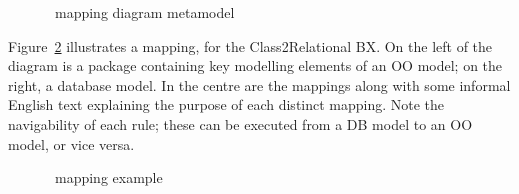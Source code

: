 \begin{figure}[htbp]
\caption{\transml\ mapping diagram metamodel}
\label{fig:transml-mapping-diagram}
\end{figure}

Figure~\ref{fig:transml-mapping-example1} illustrates a mapping, for the Class2Relational BX. On the left of the diagram is a package containing key modelling elements of an OO model; on the right, a database model. In the centre are the mappings along with some informal English text explaining the purpose of each distinct mapping. Note the navigability of each rule; these can be executed from a DB model to an OO model, or vice versa.

\begin{figure}[htbp]
\caption{\transml\ mapping example}
\label{fig:transml-mapping-example1}
\end{figure}

